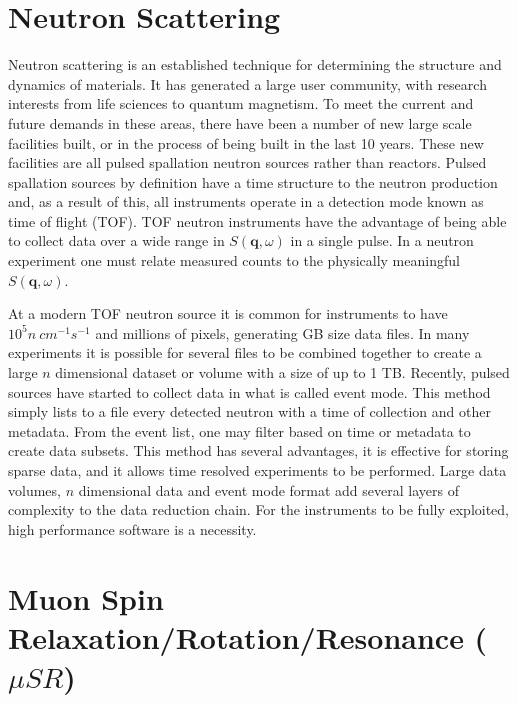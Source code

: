 \documentclass[1p]{elsarticle}
\begin{document}
\section{Neutron Scattering}

Neutron scattering is an established technique for determining the structure and dynamics of materials. It has generated a large user community, with research interests from life sciences to quantum magnetism. To meet the current and future demands in these areas, there have been a number of new large scale facilities built, or in the process of being built in the last 10 years. These new facilities are all pulsed spallation neutron sources rather than reactors. Pulsed spallation sources by definition have a time structure to the neutron production and, as a result of this, all instruments operate in a detection mode known as time of flight (TOF). TOF neutron instruments have the advantage of being able to collect data over a wide range in $S(\textbf{q},\omega)$ in a single pulse. 
In a neutron experiment one must relate measured counts to the physically meaningful $S(\textbf{q},\omega)$.

At a modern TOF neutron source it is common for instruments to have $10^5 n\ cm^{-1}s^{-1}$ and millions of pixels, generating GB size data files. In many experiments it is possible for several files to be combined together to create a large $n$ dimensional dataset or volume with a size of up to 1 TB.
Recently, pulsed sources have started to collect data in what is called event mode. This method simply lists to a file every detected neutron with a time of collection and other metadata. From the event list, one may filter based on time or metadata to create data subsets. This method has several advantages, it is effective for storing sparse data, and it allows time resolved experiments to be performed. 
Large data volumes, $n$ dimensional data and event mode format add several layers of complexity to the data reduction chain. For the instruments to be fully exploited, high performance software is a necessity. 



\section{Muon Spin Relaxation/Rotation/Resonance ($\mu SR$) }
\end{document}
